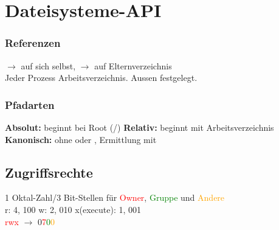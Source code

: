 \section{Dateisysteme-API}
\subsubsection{Referenzen}
$\rightarrow$ auf sich selbst, $\rightarrow$ auf Elternverzeichnis\\
Jeder Prozess Arbeitsverzeichnis. Aussen festgelegt.

\subsubsection{Pfadarten}
\textbf{Absolut:} beginnt bei Root (/)
\textbf{Relativ:} beginnt mit Arbeitsverzeichnis
\textbf{Kanonisch:} ohne  oder , Ermittlung mit 
\subsection{Zugriffsrechte}
1 Oktal-Zahl/3 Bit-Stellen für \textcolor{red}{Owner}, \textcolor{green}{Gruppe} und \textcolor{orange}{Andere}\\
r: 4, 100 w: 2, 010 x(execute): 1, 001\\
\textcolor{red}{rwx}\textcolor{green}{\prgc{---}}\textcolor{orange}{\prgc{---}} $\rightarrow$ 0\textcolor{red}{7}\textcolor{green}{0}\textcolor{orange}{0}

